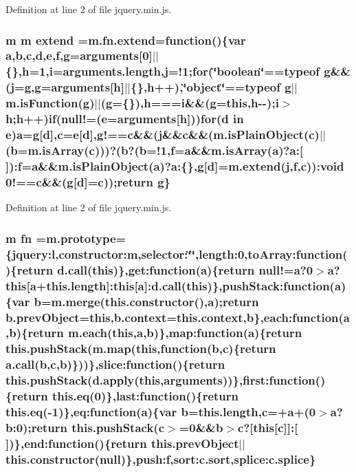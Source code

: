 Definition at line 2 of file jquery.\+min.\+js.

\subsubsection[{extend}]{\setlength{\rightskip}{0pt plus 5cm}m m extend =m.\+fn.\+extend=function()\{var {\bf a},{\bf b},{\bf c},{\bf d},{\bf e},{\bf f},g=arguments[0]$\vert$$\vert$\{\},h=1,{\bf i}=arguments.\+length,j=!1;{\bf for}(\char`\"{}boolean\char`\"{}==typeof g\&\&(j=g,g=arguments[h]$\vert$$\vert$\{\},h++),\char`\"{}object\char`\"{}==typeof g$\vert$$\vert$m.\+is\+Function(g)$\vert$$\vert$(g=\{\}),h==={\bf i}\&\&(g={\bf this},h-\/-\/);{\bf i}$>$h;h++){\bf if}(null!=({\bf e}=arguments[h])){\bf for}({\bf d} in {\bf e}){\bf a}=g[{\bf d}],{\bf c}={\bf e}[{\bf d}],g!=={\bf c}\&\&(j\&\&{\bf c}\&\&(m.\+is\+Plain\+Object({\bf c})$\vert$$\vert$({\bf b}=m.\+is\+Array({\bf c})))?({\bf b}?({\bf b}=!1,{\bf f}={\bf a}\&\&m.\+is\+Array({\bf a})?a\+:[$\,$])\+:{\bf f}={\bf a}\&\&m.\+is\+Plain\+Object({\bf a})?a\+:\{\},g[{\bf d}]=m.\+extend(j,{\bf f},{\bf c}))\+:void 0!=={\bf c}\&\&(g[{\bf d}]={\bf c}));{\bf return} g\}}\label{jquery_8min_8js_a167947be5252c14d5389d8a01a8c8545}


Definition at line 2 of file jquery.\+min.\+js.

\subsubsection[{fn}]{\setlength{\rightskip}{0pt plus 5cm}m fn ={\bf m.\+prototype}=\{jquery\+:l,constructor\+:m,selector\+:\char`\"{}\char`\"{},length\+:0,to\+Array\+:function()\{{\bf return} {\bf d.\+call}({\bf this})\},get\+:function({\bf a})\{{\bf return} null!={\bf a}?0$>${\bf a}?{\bf this}[{\bf a}+this.\+length]\+:{\bf this}[{\bf a}]\+:{\bf d.\+call}({\bf this})\},push\+Stack\+:function({\bf a})\{var {\bf b}={\bf m.\+merge}(this.\+constructor(),{\bf a});{\bf return} b.\+prev\+Object={\bf this},b.\+context=this.\+context,{\bf b}\},each\+:function({\bf a},{\bf b})\{{\bf return} {\bf m.\+each}({\bf this},{\bf a},{\bf b})\},map\+:function({\bf a})\{{\bf return} this.\+push\+Stack({\bf m.\+map}({\bf this},function({\bf b},{\bf c})\{{\bf return} {\bf a.\+call}({\bf b},{\bf c},{\bf b})\}))\},slice\+:function()\{{\bf return} this.\+push\+Stack(d.\+apply({\bf this},arguments))\},first\+:function()\{{\bf return} this.\+eq(0)\},last\+:function()\{{\bf return} this.\+eq(-\/1)\},eq\+:function({\bf a})\{var {\bf b}=this.\+length,{\bf c}=+{\bf a}+(0$>${\bf a}?b\+:0);{\bf return} this.\+push\+Stack({\bf c}$>$=0\&\&{\bf b}$>${\bf c}?[{\bf this}[{\bf c}]]\+:[$\,$])\},end\+:function()\{{\bf return} this.\+prev\+Object$\vert$$\vert$this.\+constructor(null)\},push\+:f,{\bf sort\+:c.\+sort},splice\+:c.\+splice\}}\label{jquery_8min_8js_ab2836ee14921cbd6e34ea91a9a99ad66}


